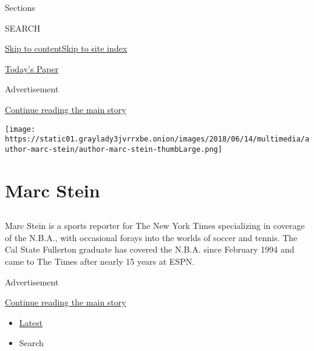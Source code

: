 Sections

SEARCH

\protect\hyperlink{site-content}{Skip to
content}\protect\hyperlink{site-index}{Skip to site index}

\href{https://myaccount.nytimes3xbfgragh.onion/auth/login?response_type=cookie\&client_id=vi}{}

\href{https://www.nytimes3xbfgragh.onion/section/todayspaper}{Today's
Paper}

Advertisement

\protect\hyperlink{after-top}{Continue reading the main story}

\texttt{[image: https://static01.graylady3jvrrxbe.onion/images/2018/06/14/multimedia/author-marc-stein/author-marc-stein-thumbLarge.png]}

\hypertarget{marc-stein}{%
\section{Marc Stein}\label{marc-stein}}

\subsection{}

Marc Stein is a sports reporter for The New York Times specializing in
coverage of the N.B.A., with occasional forays into the worlds of soccer
and tennis. The Cal State Fullerton graduate has covered the N.B.A.
since February 1994 and came to The Times after nearly 15 years at ESPN.

Advertisement

\protect\hyperlink{after-mid1}{Continue reading the main story}

\begin{itemize}
\tightlist
\item
  \protect\hyperlink{stream-panel}{Latest}
\item
  Search
\end{itemize}

